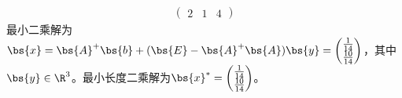 \documentclass[12pt, a4paper, oneside, UTF8]{ctexbook}
\begin{document}
\begin{solution}
\begin{enumerate}[label=(\arabic*)]
\begin{align*}
\begin{pmatrix}
                2&1&4
            \end{pmatrix}
        \end{align*}
        最小二乘解为$\bs{x}=\bs{A}^+\bs{b}+(\bs{E}-\bs{A}^+\bs{A})\bs{y}
        =\begin{pmatrix}
            \frac{1}{14}\\
            \frac{10}{14}\\
        \end{pmatrix}$，其中$\bs{y}\in \R^3$。最小长度二乘解为$\bs{x}^{*}=\begin{pmatrix}
            \frac{1}{14}\\
            \frac{10}{14}\\
        \end{pmatrix}$。
    \end{enumerate}

\end{solution}



\ifx\allfiles\undefined
\end{document}
